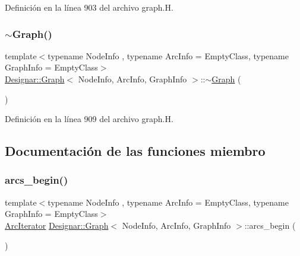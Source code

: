 Definición en la línea 903 del archivo graph.\+H.

\mbox{\label{class_designar_1_1_graph_a2ea20f9cb46279210e1eadaebcfe27f0}} 
\subsubsection{\texorpdfstring{$\sim$\+Graph()}{~Graph()}}
{\footnotesize\ttfamily template$<$typename Node\+Info , typename Arc\+Info  = Empty\+Class, typename Graph\+Info  = Empty\+Class$>$ \\
\hyperlink{class_designar_1_1_graph}{Designar\+::\+Graph}$<$ Node\+Info, Arc\+Info, Graph\+Info $>$\+::$\sim$\hyperlink{class_designar_1_1_graph}{Graph} (\begin{DoxyParamCaption}{ }\end{DoxyParamCaption})\hspace{0.3cm}{\ttfamily [inline]}}



Definición en la línea 909 del archivo graph.\+H.



\subsection{Documentación de las funciones miembro}
\mbox{\label{class_designar_1_1_graph_a9448ba557a7b0ef90651d74d4a4ee36b}} 
\subsubsection{\texorpdfstring{arcs\+\_\+begin()}{arcs\_begin()}\hspace{0.1cm}{\footnotesize\ttfamily [1/4]}}
{\footnotesize\ttfamily template$<$typename Node\+Info , typename Arc\+Info  = Empty\+Class, typename Graph\+Info  = Empty\+Class$>$ \\
\hyperlink{class_designar_1_1_graph_1_1_arc_iterator}{Arc\+Iterator} \hyperlink{class_designar_1_1_graph}{Designar\+::\+Graph}$<$ Node\+Info, Arc\+Info, Graph\+Info $>$\+::arcs\+\_\+begin (\begin{DoxyParamCaption}{ }\end{DoxyParamCaption})\hspace{0.3cm}{\ttfamily [inline]}}



